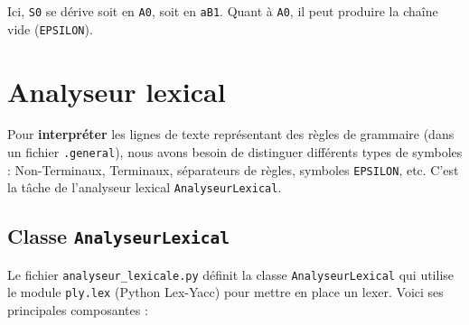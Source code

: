 \documentclass[a4paper,12pt]{article}
\begin{document}
Ici, \texttt{S0} se dérive soit en \texttt{A0}, soit en \texttt{aB1}. Quant à \texttt{A0}, il peut produire la chaîne vide (\texttt{EPSILON}).

\section{Analyseur lexical}
\label{sec:analyseur-lexical}

Pour \textbf{interpréter} les lignes de texte représentant des règles de grammaire (dans un fichier 
\texttt{.general}), nous avons besoin de distinguer différents types de symboles : Non-Terminaux, 
Terminaux, séparateurs de règles, symboles \texttt{EPSILON}, etc. C’est la tâche de l’analyseur lexical 
\texttt{AnalyseurLexical}.

\subsection{Classe \texttt{AnalyseurLexical}}
\label{subsec:classe-analyseur-lexical}

Le fichier \texttt{analyseur\_lexicale.py} définit la classe \texttt{AnalyseurLexical} qui utilise le 
module \texttt{ply.lex} (Python Lex-Yacc) pour mettre en place un lexer. Voici ses principales composantes :
\end{document}
